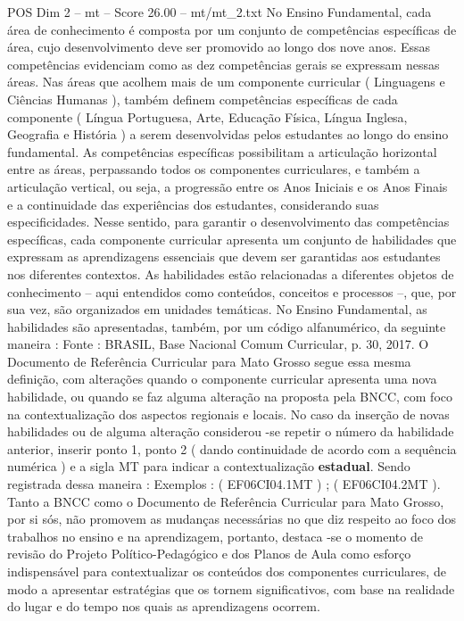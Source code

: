 \begin{textsample}{POS Dim 2 – mt – Score 26.00 – mt/mt\_2.txt}
No Ensino Fundamental, cada área de conhecimento é composta por um conjunto de competências específicas de área, cujo desenvolvimento deve ser promovido ao longo dos nove anos.
Essas competências evidenciam como as dez competências gerais se expressam nessas áreas.
Nas áreas que acolhem mais de um componente curricular ( Linguagens e Ciências Humanas ), também definem competências específicas de cada componente ( Língua Portuguesa, Arte, Educação Física, Língua Inglesa, Geografia e História ) a serem desenvolvidas pelos estudantes ao longo do ensino fundamental.
As competências específicas possibilitam a articulação horizontal entre as áreas, perpassando todos os componentes curriculares, e também a articulação vertical, ou seja, a progressão entre os Anos Iniciais e os Anos Finais e a continuidade das experiências dos estudantes, considerando suas especificidades.
Nesse sentido, para garantir o desenvolvimento das competências específicas, cada componente curricular apresenta um conjunto de habilidades que expressam as aprendizagens essenciais que devem ser garantidas aos estudantes nos diferentes contextos.
As habilidades estão relacionadas a diferentes objetos de conhecimento – aqui entendidos como conteúdos, conceitos e processos –, que, por sua vez, são organizados em unidades temáticas.
No Ensino Fundamental, as habilidades são apresentadas, também, por um código alfanumérico, da seguinte maneira : Fonte : BRASIL, Base Nacional Comum Curricular, p. 30, 2017.
O Documento de Referência Curricular para Mato Grosso segue essa mesma definição, com alterações quando o componente curricular apresenta uma nova habilidade, ou quando se faz alguma alteração na proposta pela BNCC, com foco na contextualização dos aspectos regionais e locais.
No caso da inserção de novas habilidades ou de alguma alteração considerou -se repetir o número da habilidade anterior, inserir ponto 1, ponto 2 ( dando continuidade de acordo com a sequência numérica ) e a sigla MT para indicar a contextualização \textbf{estadual}.
Sendo registrada dessa maneira : Exemplos : ( EF06CI04.1MT ) ; ( EF06CI04.2MT ).
Tanto a BNCC como o Documento de Referência Curricular para Mato Grosso, por si sós, não promovem as mudanças necessárias no que diz respeito ao foco dos trabalhos no ensino e na aprendizagem, portanto, destaca -se o momento de revisão do Projeto Político-Pedagógico e dos Planos de Aula como esforço indispensável para contextualizar os conteúdos dos componentes curriculares, de modo a apresentar estratégias que os tornem significativos, com base na realidade do lugar e do tempo nos quais as aprendizagens ocorrem.

\end{textsample}
